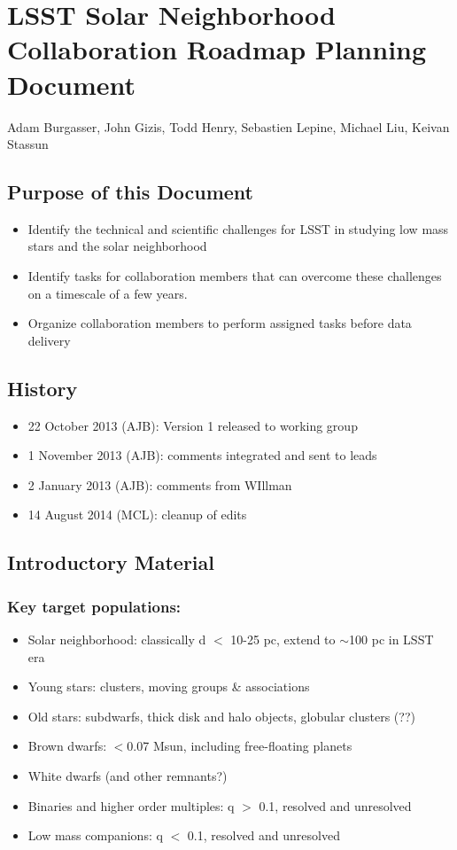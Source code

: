 \section{LSST Solar Neighborhood Collaboration Roadmap Planning Document }

Adam Burgasser, John Gizis, Todd Henry, Sebastien Lepine, Michael Liu, Keivan Stassun 



\subsection{Purpose of this Document }
\begin{itemize}
\item{Identify 
the technical and scientific challenges for LSST in studying low mass stars and  the solar neighborhood }
\item{Identify 
tasks for collaboration members that can overcome these challenges on a  timescale of a few years. }
\item{Organize 
collaboration members to perform assigned tasks before data delivery }
\end{itemize}


\subsection{History }

\begin{itemize}
\item 22 October 2013 (AJB): Version 1 released to working group 
\item 1 November 2013 (AJB): comments integrated and sent to leads 
\item 2 January 2013 (AJB): comments from WIllman 
\item 14 August 2014 (MCL): cleanup of edits 
\end{itemize}

\subsection{Introductory Material}

\subsubsection{Key target populations:}
\begin{itemize}
\item{Solar 
neighborhood: classically d $<$ 10-25 pc, extend to $\sim$100 pc in LSST era}
\item{Young 
stars: clusters, moving groups \& associations }
\item{Old 
stars: subdwarfs, thick disk and halo objects, globular clusters (??) }
\item{Brown 
dwarfs: $<$0.07 Msun, including free-floating planets }
\item{White 
dwarfs (and other remnants?) }
\item{Binaries 
and higher order multiples: q $>$ 0.1, resolved and unresolved}
\item{Low 
mass companions: q $<$ 0.1, resolved and unresolved }
\end{itemize}

